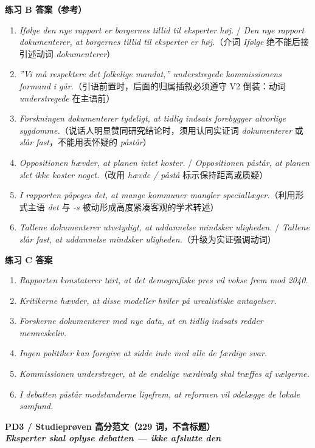 \begin{answerbox}
\textbf{练习 B 答案（参考）}
\begin{enumerate}
  \item \textit{Ifølge den nye rapport er borgernes tillid til eksperter høj.} / \textit{Den nye rapport dokumenterer, at borgernes tillid til eksperter er høj.}（介词 \textit{Ifølge} 绝不能后接引述动词 \textit{dokumenterer}）
  \item \textit{”Vi må respektere det folkelige mandat,” understregede kommissionens formand i går.}（引语前置时，后面的归属插叙必须遵守 V2 倒装：动词 \textit{understregede} 在主语前）
  \item \textit{Forskningen dokumenterer tydeligt, at tidlig indsats forebygger alvorlige sygdomme.}（说话人明显赞同研究结论时，须用认同实证词 \textit{dokumenterer} 或 \textit{slår fast}，不能用表怀疑的 \textit{påstår}）
  \item \textit{Oppositionen hævder, at planen intet koster.} / \textit{Oppositionen påstår, at planen slet ikke koster noget.}（改用 \textit{hævde / påstå} 标示保持距离或质疑）
  \item \textit{I rapporten påpeges det, at mange kommuner mangler speciallæger.}（利用形式主语 \textit{det} 与 \textit{-s} 被动形成高度紧凑客观的学术转述）
  \item \textit{Tallene dokumenterer utvetydigt, at uddannelse mindsker uligheden.} / \textit{Tallene slår fast, at uddannelse mindsker uligheden.}（升级为实证强调动词）
\end{enumerate}

\textbf{练习 C 答案}
\begin{enumerate}
  \item \textit{Rapporten konstaterer tørt, at det demografiske pres vil vokse frem mod 2040.}
  \item \textit{Kritikerne hævder, at disse modeller hviler på urealistiske antagelser.}
  \item \textit{Forskerne dokumenterer med nye data, at en tidlig indsats redder menneskeliv.}
  \item \textit{Ingen politiker kan foregive at sidde inde med alle de færdige svar.}
  \item \textit{Kommissionen understreger, at de endelige værdivalg skal træffes af vælgerne.}
  \item \textit{I debatten påstår modstanderne ligefrem, at reformen vil ødelægge de lokale samfund.}
\end{enumerate}

\textbf{PD3 / Studieprøven 高分范文（229 词，不含标题）}\\
\textit{\textbf{Eksperter skal oplyse debatten --- ikke afslutte den}}


\end{answerbox}

